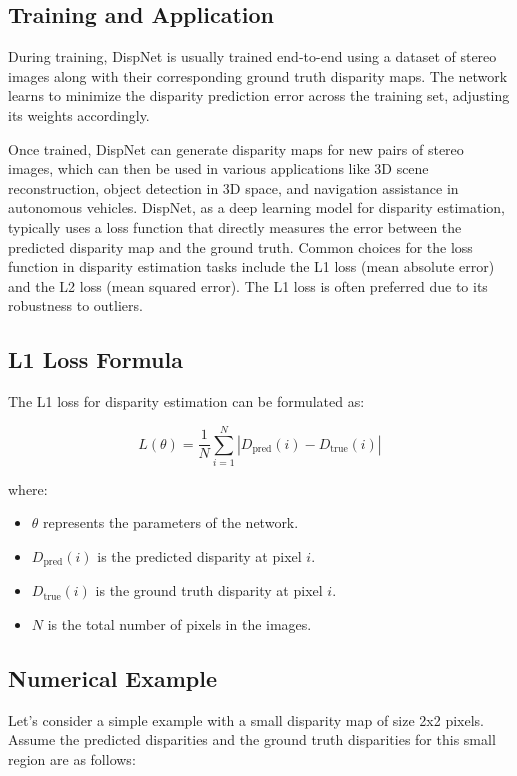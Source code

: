 \documentclass[22pt]{report}
\begin{document}
\subsection{Training and Application}
During training, DispNet is usually trained end-to-end using a dataset of stereo images along with their corresponding ground truth disparity maps. The network learns to minimize the disparity prediction error across the training set, adjusting its weights accordingly.

Once trained, DispNet can generate disparity maps for new pairs of stereo images, which can then be used in various applications like 3D scene reconstruction, object detection in 3D space, and navigation assistance in autonomous vehicles.
\newpage
DispNet, as a deep learning model for disparity estimation, typically uses a loss function that directly measures the error between the predicted disparity map and the ground truth. Common choices for the loss function in disparity estimation tasks include the L1 loss (mean absolute error) and the L2 loss (mean squared error). The L1 loss is often preferred due to its robustness to outliers.\\
\subsection{L1 Loss Formula}
The L1 loss for disparity estimation can be formulated as:
\begin{center}
    \[
L(\theta) = \frac{1}{N} \sum_{i=1}^{N} \left| D_{\text{pred}}(i) - D_{\text{true}}(i) \right|
\]
\end{center}
where:
\begin{itemize}
    \item \(\theta\) represents the parameters of the network. \\
    \item \( D_{\text{pred}}(i) \) is the predicted disparity at pixel \( i \). \\
    \item \( D_{\text{true}}(i) \) is the ground truth disparity at pixel \( i \). \\
    \item \( N \) is the total number of pixels in the images.
\end{itemize}
\vspace{20}
\subsection*{Numerical Example}
Let's consider a simple example with a small disparity map of size 2x2 pixels. Assume the predicted disparities and the ground truth disparities for this small region are as follows:
\end{document}
